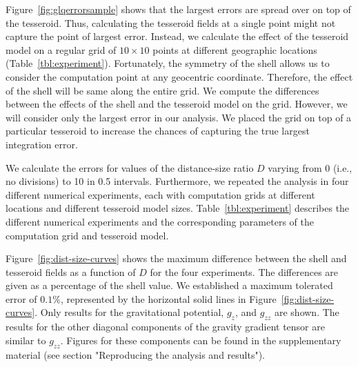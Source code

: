 \documentclass[paper,twocolumn,twoside]{geophysics}
\begin{document}
Figure~\ref{fig:glqerrorsample} shows that the largest errors are spread over
on top of the tesseroid.
Thus, calculating the tesseroid fields at a single point might not
capture the point of largest error.
Instead, we calculate the effect of the tesseroid model on a regular grid
of $10 \times 10$ points at different geographic locations
(Table~\ref{tbl:experiment}).
Fortunately, the symmetry of the shell allows us to consider the computation
point at any geocentric coordinate.
Therefore, the effect of the shell will be same along the entire grid.
We compute the differences between the effects of the shell and the tesseroid
model on the grid.
However, we will consider only the largest error in our analysis.
We placed the grid on top of a particular tesseroid
to increase the chances of capturing the true largest integration error.


We calculate the errors for values of the distance-size ratio
$D$ varying from 0 (i.e., no divisions) to 10 in 0.5 intervals.
Furthermore, we repeated the analysis in four different numerical experiments,
each with computation grids at different locations and
different tesseroid model sizes.
Table~\ref{tbl:experiment} describes the different numerical
experiments and the corresponding parameters of the computation grid and
tesseroid model.


Figure~\ref{fig:dist-size-curves} shows
the maximum difference between the shell and tesseroid fields
as a function of $D$ for the four experiments.
The differences are given as a percentage of the shell value.
We established a maximum tolerated error of $0.1\%$, represented by the
horizontal solid lines in Figure~\ref{fig:dist-size-curves}.
Only results for the gravitational potential, $g_z$, and $g_{zz}$ are shown.
The results for the other diagonal components of the gravity gradient tensor
are similar to $g_{zz}$.
Figures for these components can be found in the supplementary material
(see section "Reproducing the analysis and results").
\end{document}

